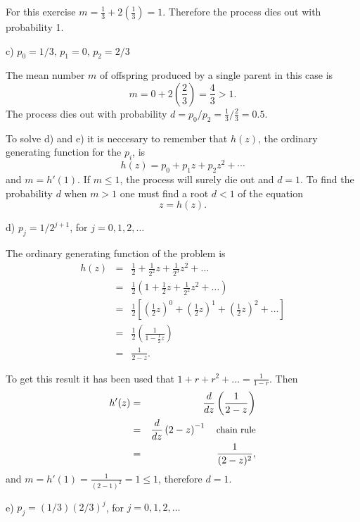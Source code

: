 \documentclass[12pt]{article}
\begin{document}
	For this exercise $m = \frac{1}{3} + 2\left(\frac{1}{3} \right) = 1$. Therefore the process dies out with probability 1.
	
	\noindent c) $p_0 = 1 / 3, \, p_1 = 0, \, p_2 = 2 / 3$
	
	The mean number $m$ of offspring produced by a single parent in this case is
	\begin{equation*}
	m = 0 + 2\left( \frac{2}{3} \right) = \frac{4}{3} > 1.
	\end{equation*}
	The process dies out with probability $d= p_0/p_2 = \frac{1}{3}/\frac{2}{3} = 0.5$.
	
	To solve d) and e) it is neccesary to remember that $h(z)$, the ordinary generating function for the $p_i$, is 
	$$h(z) = p_0 + p_1 z + p_2 z^2 + \cdots $$
	and $m=h'(1)$. If $m\leq 1$, the process will surely die out and $d = 1$. To find the
	probability $d$ when $m > 1$ one must find a root $d < 1$ of the equation
	\begin{equation*}
	z = h(z).
	\end{equation*}
	
	\noindent d) $p_j = 1 / 2^{j + 1}$, for $j = 0, 1, 2, \ldots$
	
	The ordinary generating function of the problem is 
	\begin{eqnarray*}
	h(z) &=& \frac{1}{2} + \frac{1}{2^2}z + \frac{1}{2^3}z^2 + \ldots \\
	&=& \frac{1}{2} \left( 1 + \frac{1}{2} z + \frac{1}{2^2}z^2 + \ldots \right) \\
	&=& \frac{1}{2} \left[ \left(\frac{1}{2}z\right)^0 + \left(\frac{1}{2}z\right)^1 + \left(\frac{1}{2}z\right)^2 + \ldots \right] \\
	&=& \frac{1}{2} \left(\frac{1}{1 - \frac{1}{2} z}\right)\\
	&=& \frac{1}{2 - z}.
	\end{eqnarray*}

	To get this result it has been used that $1+r+r^2 + \ldots  = \frac{1}{1-r}$. Then  \begin{eqnarray*}
		h'(z) &=& \frac{d}{dz} \left( \frac{1}{2 - z} \right) \\
		&=& \frac{d}{dz} \left( 2 - z \right)^{-1} \quad {\text{\small chain rule}} \\
		&=& \frac{1}{(2 - z)^2}, 
	\end{eqnarray*}
	and $m = h'(1) = \frac{1}{(2 - 1)^2} = 1 \leq 1$, therefore $d = 1$.
	
	\noindent e) $p_j = (1 / 3) (2/3)^j$, for $j = 0, 1, 2, \ldots$
	
\end{document}
